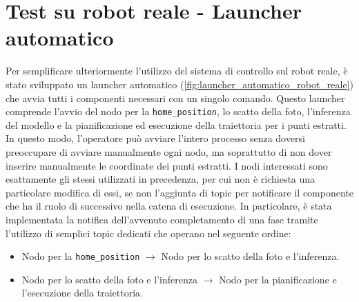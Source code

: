 \section{Test su robot reale - Launcher automatico}
Per semplificare ulteriormente l'utilizzo del sistema di controllo sul robot reale, è stato sviluppato un launcher automatico (\ref{fig:launcher_automatico_robot_reale}) che avvia tutti i componenti necessari con un singolo comando.
Questo launcher comprende l'avvio del nodo per la \texttt{home\_position}, lo scatto della foto, l'inferenza del modello e la pianificazione ed esecuzione della traiettoria per i punti estratti.
In questo modo, l'operatore può avviare l'intero processo senza doversi preoccupare di avviare manualmente ogni nodo, ma soprattutto di non dover inserire manualmente le coordinate dei punti estratti.
I nodi interessati sono esattamente gli stessi utilizzati in precedenza, per cui non è richiesta una particolare modifica di essi, se non l'aggiunta di topic per notificare il componente che ha il ruolo di successivo nella catena di esecuzione.
In particolare, è stata implementata la notifica dell'avvenuto completamento di una fase tramite l'utilizzo di semplici topic dedicati che operano nel seguente ordine:
\begin{itemize}
    \item Nodo per la \texttt{home\_position} $\longrightarrow$ Nodo per lo scatto della foto e l'inferenza.
    \item Nodo per lo scatto della foto e l'inferenza $\longrightarrow$ Nodo per la pianificazione e l'esecuzione della traiettoria.
\end{itemize}